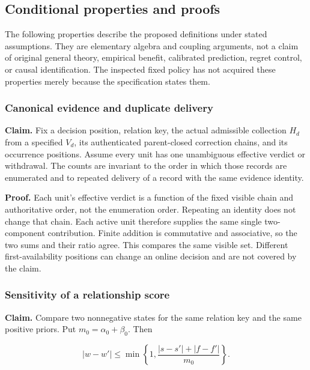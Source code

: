 \documentclass[
  english,
  11pt,
]{article}
\begin{document}
\subsection{Conditional properties and
proofs}\label{conditional-properties-and-proofs}

The following properties describe the proposed definitions under stated
assumptions. They are elementary algebra and coupling arguments, not a
claim of original general theory, empirical benefit, calibrated
prediction, regret control, or causal identification. The inspected
fixed policy has not acquired these properties merely because the
specification states them.

\subsubsection{Canonical evidence and duplicate
delivery}\label{canonical-evidence-and-duplicate-delivery}

\textbf{Claim.} Fix a decision position, relation key, the actual
admissible collection \(H_d\) from a specified \(V_d\), its
authenticated parent-closed correction chains, and its occurrence
positions. Assume every unit has one unambiguous effective verdict or
withdrawal. The counts are invariant to the order in which those records
are enumerated and to repeated delivery of a record with the same
evidence identity.

\textbf{Proof.} Each unit's effective verdict is a function of the fixed
visible chain and authoritative order, not the enumeration order.
Repeating an identity does not change that chain. Each active unit
therefore supplies the same single two-component contribution. Finite
addition is commutative and associative, so the two sums and their ratio
agree. This compares the same visible set. Different first-availability
positions can change an online decision and are not covered by the
claim.

\subsubsection{Sensitivity of a relationship
score}\label{sensitivity-of-a-relationship-score}

\textbf{Claim.} Compare two nonnegative states for the same relation key
and the same positive priors. Put \(m_0=\alpha_0+\beta_0\). Then

\[
|w-w'|\leq\min\left\{1,
\frac{|s-s'|+|f-f'|}{m_0}\right\}.
\]
\end{document}
